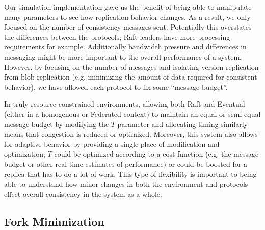 \documentclass[10pt,conference,letterpaper]{IEEEtran}
\newcommand{\todo}[1]{{\textcolor{red}{#1}}}
\newcommand{\pjk}[1]{[\todo{PJK: #1}]}
\newcommand{\note}[1]{\textcolor{blue}{[#1]}}
\begin{document}
Our simulation implementation gave us the benefit of being able to manipulate many parameters to see how replication behavior changes. As a result, we only focused on the number of consistency messages sent. Potentially this overstates the differences between the protocols; Raft leaders have more processing requirements for example. Additionally bandwidth pressure and differences in messaging might be more important to the overall performance of a system. However, by focusing on the number of messages and isolating version replication from blob replication (e.g. minimizing the amount of data required for consistent behavior), we have allowed each protocol to fix some ``message budget''.

In truly resource constrained environments, allowing both Raft and Eventual (either in a homogenous or Federated context) to maintain an equal or semi-equal message budget by modifying the $T$ parameter and allocating timing similarly means that congestion is reduced or optimized. Moreover, this system also allows for adaptive behavior by providing a single place of modification and optimization; $T$ could be optimized according to a cost function (e.g. the message budget or other real time estimates of performance) or could be boosted for a replica that has to do a lot of work. This type of flexibility is important to being able to understand how minor changes in both the environment and protocols effect overall consistency in the system as a whole.



\subsection{Fork Minimization}
\end{document}
